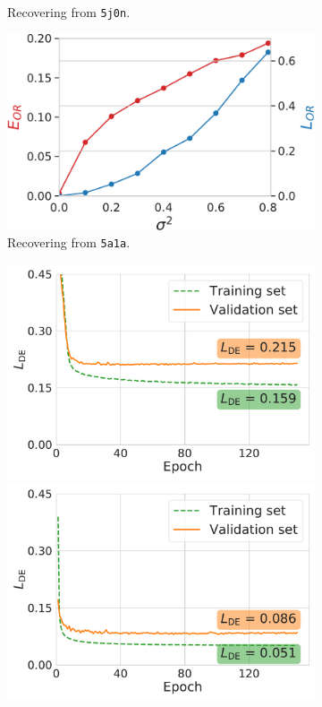 \begin{figure}
\begin{minipage}[b]{0.48\linewidth}
\begin{subfigure}[b]{0.49\linewidth}
            \caption{Recovering from \texttt{5j0n}.}
        \end{subfigure}
        \hfill
        \begin{subfigure}[b]{0.49\linewidth}
        \centering
            \includegraphics[width=\linewidth]{figures/5a1a_perfect_noisy_ar_aa}
            \caption{Recovering from \texttt{5a1a}.}
        \end{subfigure}
        \caption{%
            Orientation recovery from perturbed distances.
        }\label{fig:perfect-with-noise-ar-aa}
    \end{minipage}
    \hfill
    \begin{minipage}[b]{0.45\linewidth}
        \begin{subfigure}[b]{\linewidth}
            \centering
            \includegraphics[width=0.47\linewidth]{figures/de_5j0n_fullcov_uniformS2.pdf}
            \hfill
            \includegraphics[width=0.47\linewidth]{figures/de_5a1a_quartercov_uniformS2.pdf}

\end{subfigure}
\end{minipage}
\end{figure}

